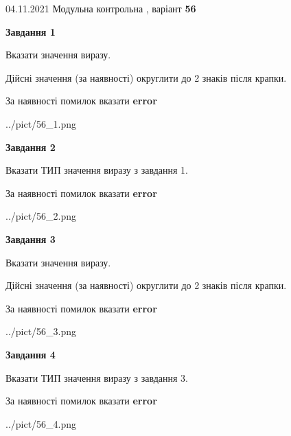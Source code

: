 \documentclass[11pt, ukrainian]{article}
\begin{document}
{04.11.2021 Модульна контрольна , варіант  \No \textbf { 56 }\par}
{
\begin {large}
{\begin {center}\textbf{Завдання 1}\end {center}}\par
Вказати значення виразу. \par
Дійсні значення (за наявності) округлити до 2 знаків після крапки. \par
За наявності помилок вказати \textbf{error}

\begin{center}
	{../pict/56_1.png}
\end{center}
\newpage

{\begin {center}\textbf{Завдання 2}\end {center}}\par
Вказати ТИП значення виразу з завдання 1. \par
За наявності помилок вказати \textbf{error}

\begin{center}
	{../pict/56_2.png}
\end{center}
\newpage

{\begin {center}\textbf{Завдання 3}\end {center}}\par
Вказати значення виразу. \par
Дійсні значення (за наявності) округлити до 2 знаків після крапки. \par
За наявності помилок вказати \textbf{error}

\begin{center}
	{../pict/56_3.png}
\end{center}
\newpage

{\begin {center}\textbf{Завдання 4}\end {center}}\par
Вказати ТИП значення виразу з завдання 3. \par
За наявності помилок вказати \textbf{error}

\begin{center}
	{../pict/56_4.png}
\end{center}
\newpage


\end{large}}
\end{document}
